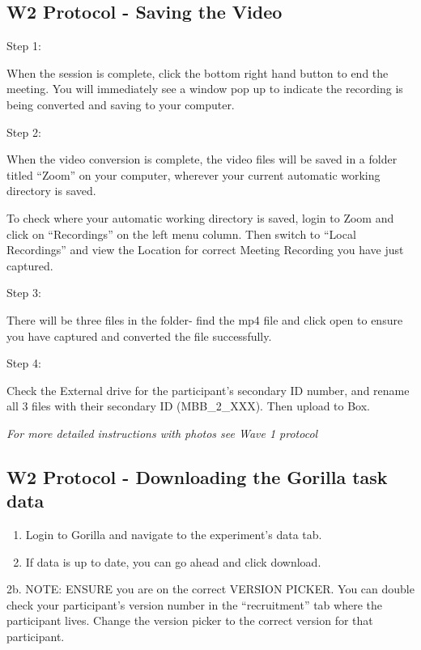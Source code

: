 \documentclass[]{book}
\begin{document}
\hypertarget{w2-protocol---saving-the-video}{%
\subsection{W2 Protocol - Saving the Video}\label{w2-protocol---saving-the-video}}

Step 1:

When the session is complete, click the bottom right hand button to end the meeting. You will immediately see a window pop up to indicate the recording is being converted and saving to your computer.

Step 2:

When the video conversion is complete, the video files will be saved in a folder titled ``Zoom'' on your computer, wherever your current automatic working directory is saved.

To check where your automatic working directory is saved, login to Zoom and click on ``Recordings'' on the left menu column. Then switch to ``Local Recordings'' and view the Location for correct Meeting Recording you have just captured.

Step 3:

There will be three files in the folder- find the mp4 file and click open to ensure you have captured and converted the file successfully.

Step 4:

Check the External drive for the participant's secondary ID number, and rename all 3 files with their secondary ID (MBB\_2\_XXX). Then upload to Box.

\emph{For more detailed instructions with photos see Wave 1 protocol}

\hypertarget{w2-protocol---downloading-the-gorilla-task-data}{%
\subsection{W2 Protocol - Downloading the Gorilla task data}\label{w2-protocol---downloading-the-gorilla-task-data}}

\begin{enumerate}
\def\labelenumi{\arabic{enumi}.}
\item
  Login to Gorilla and navigate to the experiment's data tab.
\item
  If data is up to date, you can go ahead and click download.
\end{enumerate}

2b. NOTE: ENSURE you are on the correct VERSION PICKER. You can double check your participant's version number in the ``recruitment'' tab where the participant lives. Change the version picker to the correct version for that participant.
\end{document}
